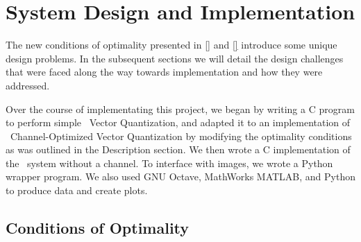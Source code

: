 \section{System Design and Implementation}
The new conditions of optimality presented in \eqref{} and \eqref{} introduce some unique design problems. In the subsequent sections we will detail the design challenges that were faced along the way towards implementation and how they were addressed.

Over the course of implementating this project, we began by writing a C program to perform simple \sysII\ Vector Quantization, and adapted it to an implementation of \sysIIN\ Channel-Optimized Vector Quantization by modifying the optimality conditions as was outlined in the Description section. We then wrote a C implementation of the \sysIJ\ system without a channel. To interface with images, we wrote a Python wrapper program. We also used GNU Octave, MathWorks MATLAB, and Python to produce data and create plots.

\subsection{Conditions of Optimality}

